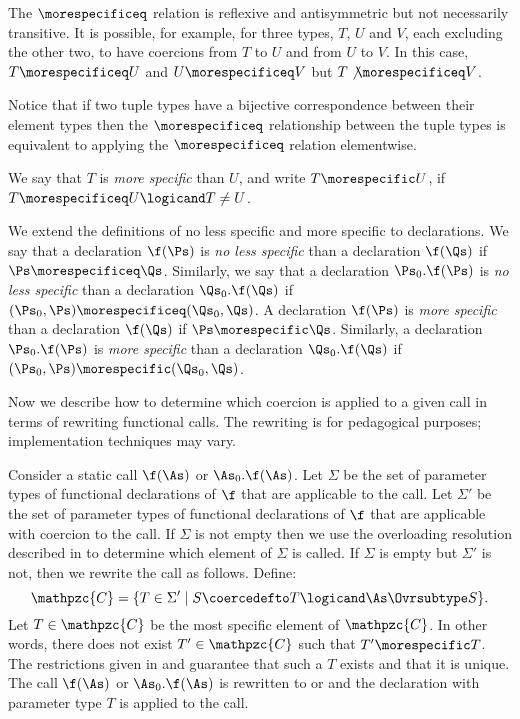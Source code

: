 The $\morespecificeq$ relation is reflexive and antisymmetric but not
necessarily transitive.  It is possible, for example, for
three types, $T$, $U$ and $V$, each excluding the other two,
to have coercions from $T$ to $U$ and from $U$ to $V$.  In
this case, $T \morespecificeq U$ and $U \morespecificeq V$ but
$T \not\morespecificeq V$.

Notice that if two tuple types have a bijective correspondence
between their element types then the $\morespecificeq$ relationship between
the tuple types is equivalent to applying the $\morespecificeq$
relation elementwise.

We say that $T$ is \emph{more specific} than $U$, and write $T
\morespecific U$, if $T \morespecificeq U \logicand T \neq U$.

We extend the definitions of no less specific and more specific to
declarations.  We say that a declaration $\f(\Ps)$ is \emph{no less
specific} than a declaration $\f(\Qs)$ if $\Ps \morespecificeq \Qs$.
Similarly, we say that a declaration $\Ps_0.\f(\Ps)$ is \emph{no less
specific} than a declaration $\Qs_0.\f(\Qs)$ if $(\Ps_0, \Ps)
\morespecificeq (\Qs_0, \Qs)$.  A declaration $\f(\Ps)$ is \emph{more
specific} than a declaration $\f(\Qs)$ if $\Ps \morespecific \Qs$.
Similarly, a declaration $\Ps_0.\f(\Ps)$ is \emph{more specific} than
a declaration $\Qs_0.\f(\Qs)$ if $(\Ps_0, \Ps) \morespecific (\Qs_0,
\Qs)$.

Now we describe how to determine which coercion is applied to a given
call in terms of rewriting functional calls.  The rewriting is
for pedagogical purposes; implementation techniques may vary.

Consider a static call $\f(\As)$ or $\As_0.\f(\As)$.  Let $\Sigma$ be
the set of parameter types of functional declarations of $\f$ that are
applicable to the call.
Let $\Sigma'$ be the set of parameter types of
functional declarations of $\f$ that are
applicable with coercion to the call.
If $\Sigma$ is not empty then we use the overloading resolution
described in  to determine which
element of $\Sigma$ is called.
If $\Sigma$ is empty but $\Sigma'$ is not, then we rewrite the call as
follows.  Define: \[\mathpzc{C} = \{T \in \Sigma' \mid S \coercedefto T
\logicand \As \Ovrsubtype S\}.\] Let $T \in \mathpzc{C}$ be the most
specific element of $\mathpzc{C}$.  In other words, there does not exist
$T' \in \mathpzc{C}$ such that $T' \morespecific T$.  The restrictions
given in  and
 guarantee that such a $T$
exists and that it is unique.  The call $\f(\As)$ or $\As_0.\f(\As)$ is
rewritten to  or
and the declaration with parameter
type $T$ is applied to the call.

